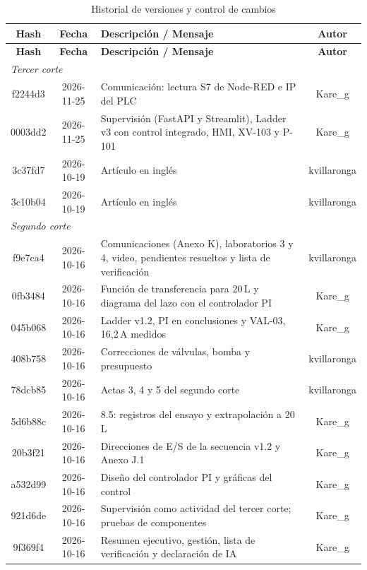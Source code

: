 \begin{longtable}{|c|c|p{7cm}|c|}
\caption{Historial de versiones y control de cambios}\label{tab:versiones}\\
\hline
\textbf{Hash} & \textbf{Fecha} & \textbf{Descripción / Mensaje} & \textbf{Autor} \\ \hline
\endfirsthead
\hline
\textbf{Hash} & \textbf{Fecha} & \textbf{Descripción / Mensaje} & \textbf{Autor} \\ \hline
\endhead
\multicolumn{4}{|l|}{\textit{Tercer corte}} \\ \hline
f2244d3 & 2026-11-25 & Comunicación: lectura S7 de Node-RED e IP del PLC & Kare\_g \\ \hline
0003dd2 & 2026-11-25 & Supervisión (FastAPI y Streamlit), Ladder v3 con control integrado, HMI, XV-103 y P-101 & Kare\_g \\ \hline
3c37fd7 & 2026-10-19 & Artículo en inglés & kvillaronga \\ \hline
3c10b04 & 2026-10-19 & Artículo en inglés & kvillaronga \\ \hline
\multicolumn{4}{|l|}{\textit{Segundo corte}} \\ \hline
f9e7ca4 & 2026-10-16 & Comunicaciones (Anexo K), laboratorios 3 y 4, video, pendientes resueltos y lista de verificación & kvillaronga \\ \hline
0fb3484 & 2026-10-16 & Función de transferencia para 20\,L y diagrama del lazo con el controlador PI & Kare\_g \\ \hline
045b068 & 2026-10-16 & Ladder v1.2, PI en conclusiones y VAL-03, 16,2\,A medidos & Kare\_g \\ \hline
408b758 & 2026-10-16 & Correcciones de válvulas, bomba y presupuesto & kvillaronga \\ \hline
78dcb85 & 2026-10-16 & Actas 3, 4 y 5 del segundo corte & kvillaronga \\ \hline
5d6b88c & 2026-10-16 & 8.5: registros del ensayo y extrapolación a 20\,L & Kare\_g \\ \hline
20b3f21 & 2026-10-16 & Direcciones de E/S de la secuencia v1.2 y Anexo J.1 & Kare\_g \\ \hline
a532d99 & 2026-10-16 & Diseño del controlador PI y gráficas del control & Kare\_g \\ \hline
921d6de & 2026-10-16 & Supervisión como actividad del tercer corte; pruebas de componentes & Kare\_g \\ \hline
9f369f4 & 2026-10-16 & Resumen ejecutivo, gestión, lista de verificación y declaración de IA & Kare\_g \\ \hline

\end{longtable}
